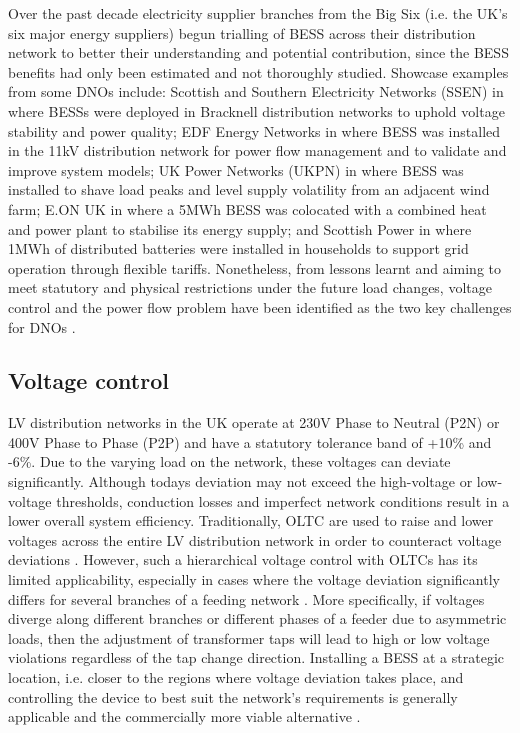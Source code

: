 Over the past decade electricity supplier branches from the Big Six (i.e. the UK's six major energy suppliers) begun trialling of BESS across their distribution network to better their understanding and potential contribution, since the BESS benefits had only been estimated and not thoroughly studied.
Showcase examples from some DNOs include:
Scottish and Southern Electricity Networks (SSEN) in \cite{NTVV2016} where BESSs were deployed in Bracknell distribution networks to uphold voltage stability and power quality;
EDF Energy Networks in \cite{Wade2010} where BESS was installed in the 11kV distribution network for power flow management and to validate and improve system models;
UK Power Networks (UKPN) in \cite{Lyons2015a} where BESS was installed to shave load peaks and level supply volatility from an adjacent wind farm;
E.ON UK in \cite{EON2017} where a 5MWh BESS was colocated with a combined heat and power plant to stabilise its energy supply;
and Scottish Power in \cite{ScottishPower2016} where 1MWh of distributed batteries were installed in households to support grid operation through flexible tariffs.
Nonetheless, from lessons learnt and aiming to meet statutory and physical restrictions under the future load changes, voltage control and the power flow problem have been identified as the two key challenges for DNOs \cite{Ferreira2013a, Shi2015}.

\subsection{Voltage control}
\label{ch-literature:subsec:voltage-control}

LV distribution networks in the UK operate at 230V Phase to Neutral (P2N) or 400V Phase to Phase (P2P) and have a statutory tolerance band of +10\% and -6\%.
Due to the varying load on the network, these voltages can deviate significantly.
Although todays deviation may not exceed the high-voltage or low-voltage thresholds, conduction losses and imperfect network conditions result in a lower overall system efficiency.
Traditionally, OLTC are used to raise and lower voltages across the entire LV distribution network in order to counteract voltage deviations \cite{Sun2009}.
However, such a hierarchical voltage control with OLTCs has its limited applicability, especially in cases where the voltage deviation significantly differs for several branches of a feeding network \cite{Zangs2016}.
More specifically, if voltages diverge along different branches or different phases of a feeder due to asymmetric loads, then the adjustment of transformer taps will lead to high or low voltage violations regardless of the tap change direction.
Installing a BESS at a strategic location, i.e. closer to the regions where voltage deviation takes place, and controlling the device to best suit the network's requirements is generally applicable and the commercially more viable alternative \cite{Liserre2010}.

